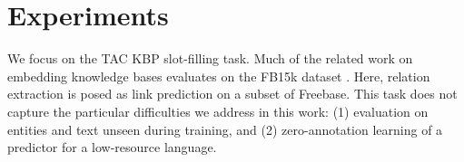 






\section{Experiments}

We focus on the TAC KBP slot-filling task. Much of the related work on embedding knowledge bases evaluates on the FB15k dataset \citep{transe,wang2014knowledge,lin2015learning,bishan,toutanova2015representing}. Here, relation extraction is posed as link prediction on a subset of Freebase.  This task does not capture the particular difficulties we address in this work: (1) evaluation on entities and text unseen during training, and (2) zero-annotation learning of a predictor for a low-resource language.

